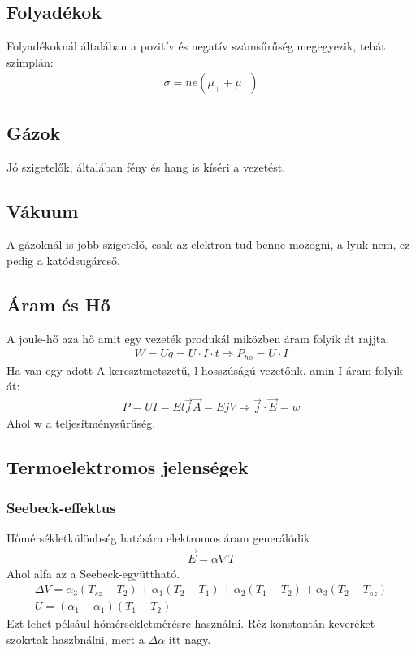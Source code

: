 \documentclass{article}
\begin{document}
\subsection{Folyadékok} 
Folyadékoknál általában a pozitív és negatív számsűrűség megegyezik, tehát szimplán:
\begin{gather*}
\sigma = n e (\mu_{+} + \mu_{-})
\end{gather*}
\subsection{Gázok}
Jó szigetelők, általában fény és hang is kíséri a vezetést.
\subsection{Vákuum}
A gázoknál is jobb szigetelő, csak az elektron tud benne mozogni, a lyuk nem, ez pedig a katódsugárcső.
\subsection{Áram és Hő}
A joule-hő aza  hő amit egy vezeték produkál miközben áram folyik át rajjta.
\begin{gather*}
W=Uq=U\cdot I\cdot t \Rightarrow P_{ho} = U\cdot I
\end{gather*}
Ha van egy adott A keresztmetszetű, l hosszúságú vezetőnk, amin I áram folyik át:
\begin{gather*}
P=UI=El\vec{j}\vec{A} = EjV \Rightarrow \vec{j} \cdot \vec{E} = w
\end{gather*}
Ahol w a teljesítménysűrűség.
\subsection{Termoelektromos jelenségek}
\subsubsection{Seebeck-effektus}
Hőmérsékletkülönbség hatására elektromos áram generálódik
\begin{gather*}
\vec{E}=\alpha \nabla T
\end{gather*}
Ahol alfa az a Seebeck-együttható.
\begin{gather*}
\Delta V= \alpha_{3}(T_{sz}-T_2) + \alpha_{1} (T_{2}-T_1) +\alpha_{2}(T_{1}-T_{2}) + \alpha_{3}(T_2-T_{sz}) \\
U=(\alpha_1-\alpha_1)(T_1-T_2)
\end{gather*}
Ezt lehet pélsául hőmérsékletmérésre használni. Réz-konstantán keveréket szokrtak haszbnálni, mert a $\Delta \alpha$ itt nagy. 
\end{document}
